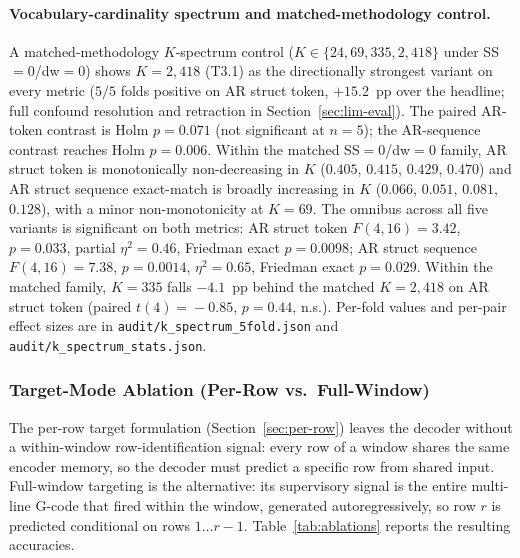 \documentclass[sensors,article,submit,moreauthors,pdftex]{Definitions/mdpi}
\begin{document}


\paragraph{Vocabulary-cardinality spectrum and matched-methodology control.}
A matched-methodology $K$-spectrum control ($K\!\in\!\{24, 69, 335, 2{,}418\}$ under SS$=$0/dw$=$0) shows $K\!=\!2{,}418$ (T3.1) as the directionally strongest variant on every metric ($5/5$ folds positive on AR struct token, $+15.2$~pp over the headline; full confound resolution and retraction in Section~\ref{sec:lim-eval}). The paired AR-token contrast is Holm $p\!=\!0.071$ (not significant at $n\!=\!5$); the AR-sequence contrast reaches Holm $p\!=\!0.006$. Within the matched SS$=$0/dw$=$0 family, AR struct token is monotonically non-decreasing in $K$ ($0.405$, $0.415$, $0.429$, $0.470$) and AR struct sequence exact-match is broadly increasing in $K$ ($0.066$, $0.051$, $0.081$, $0.128$), with a minor non-monotonicity at $K\!=\!69$. The omnibus across all five variants is significant on both metrics: AR struct token $F(4,16)\!=\!3.42$, $p\!=\!0.033$, partial $\eta^{2}\!=\!0.46$, Friedman exact $p\!=\!0.0098$; AR struct sequence $F(4,16)\!=\!7.38$, $p\!=\!0.0014$, $\eta^{2}\!=\!0.65$, Friedman exact $p\!=\!0.029$. Within the matched family, $K\!=\!335$ falls $-4.1$~pp behind the matched $K\!=\!2{,}418$ on AR struct token (paired $t(4)\!=\!-0.85$, $p\!=\!0.44$, n.s.). Per-fold values and per-pair effect sizes are in \texttt{audit/k\_spectrum\_5fold.json} and \texttt{audit/k\_spectrum\_stats.json}.


\subsubsection{Target-Mode Ablation (Per-Row vs.\ Full-Window)}
\label{sec:abl-target-mode}

The per-row target formulation (Section~\ref{sec:per-row}) leaves the decoder without a within-window row-identification signal: every row of a window shares the same encoder memory, so the decoder must predict a specific row from shared input. Full-window targeting is the alternative: its supervisory signal is the entire multi-line G-code that fired within the window, generated autoregressively, so row $r$ is predicted conditional on rows $1\!\dots\!r-1$. Table~\ref{tab:ablations} reports the resulting accuracies.
\end{document}
